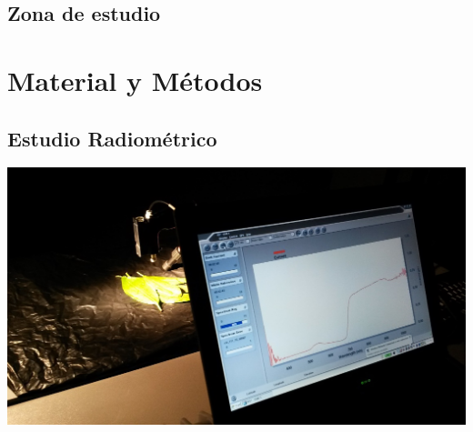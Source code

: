 \documentclass[12pt]{beamer}
\begin{document}
\subsection{Zona de estudio}
\begin{frame}
\end{frame}

\section{Material y Métodos}
\subsection{Estudio Radiométrico}
\begin{frame}
\includegraphics[width=\linewidth]{./Imagenes/Curva_espectral.jpg}
\end{frame}
\end{document}
